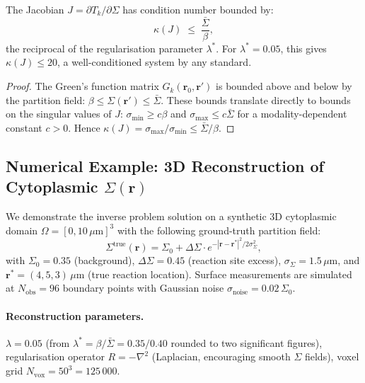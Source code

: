 \begin{corollary}
\label{cor:ch06-jacobian-condition}
The Jacobian $J = \partial T_k/\partial \Sigma$ has condition number bounded by:
\begin{equation}
  \kappa(J) \;\le\; \frac{\bar{\Sigma}}{\beta},
  \label{eq:ch06-jacobian-condition}
\end{equation}
the reciprocal of the regularisation parameter $\lambda^*$.  For
$\lambda^* = 0.05$, this gives $\kappa(J) \le 20$, a well-conditioned
system by any standard.
\end{corollary}

\begin{proof}
The Green's function matrix $G_k(\mathbf{r}_0,\mathbf{r}')$ is bounded above
and below by the partition field: $\beta \le \Sigma(\mathbf{r}') \le
\bar{\Sigma}$.  These bounds translate directly to bounds on the singular
values of $J$: $\sigma_{\min} \ge c\beta$ and $\sigma_{\max} \le c\bar{\Sigma}$
for a modality-dependent constant $c > 0$.  Hence $\kappa(J) = \sigma_{\max}/
\sigma_{\min} \le \bar{\Sigma}/\beta$.
\end{proof}

\subsection{Numerical Example: 3D Reconstruction of Cytoplasmic $\Sigma(\mathbf{r})$}
\label{sec:ch06-numerical-reconstruction}

We demonstrate the inverse problem solution on a synthetic 3D cytoplasmic
domain $\Omega = [0, 10\,\mu\text{m}]^3$ with the following ground-truth
partition field:
\begin{equation}
  \Sigma^\text{true}(\mathbf{r})
  = \Sigma_0 + \Delta\Sigma \cdot e^{-|\mathbf{r}-\mathbf{r}^*|^2/2\sigma_\Sigma^2},
  \label{eq:ch06-sigma-true}
\end{equation}
with $\Sigma_0 = 0.35$ (background), $\Delta\Sigma = 0.45$ (reaction site
excess), $\sigma_\Sigma = 1.5\,\mu\text{m}$, and $\mathbf{r}^* = (4, 5,
3)\,\mu\text{m}$ (true reaction location).  Surface measurements are
simulated at $N_\text{obs} = 96$ boundary points with Gaussian noise
$\sigma_\text{noise} = 0.02\,\Sigma_0$.

\paragraph{Reconstruction parameters.}
$\lambda = 0.05$ (from $\lambda^* = \beta/\bar{\Sigma} = 0.35/0.40$
rounded to two significant figures), regularisation operator $R = -\nabla^2$
(Laplacian, encouraging smooth $\Sigma$ fields), voxel grid $N_\text{vox} =
50^3 = 125\,000$.

